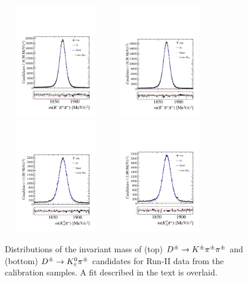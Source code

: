 \begin{figure}[hp]
\label{fig:KpiAsymFitsRun1}
\includegraphics[height=5cm,width=0.4\textwidth]{figs/KpiAsym/fit_negative_kpipi_15up.pdf}
\includegraphics[height=5cm,width=0.4\textwidth]{figs/KpiAsym/fit_positive_kpipi_15up.pdf}\\
\includegraphics[height=5cm,width=0.4\textwidth]{figs/KpiAsym/fit_negative_kspi_15up.pdf}
\includegraphics[height=5cm,width=0.4\textwidth]{figs/KpiAsym/fit_positive_kspi_15up.pdf}
\caption{Distributions of the invariant mass of (top) ${{D}^\pm}\rightarrow{\ensuremath{{K}^\pm}}{\ensuremath{{\pi}^\pm}}{\ensuremath{{\pi}^\pm}}$ and (bottom) ${{D}^\pm}\rightarrow{\ensuremath{{K}^0_{\mathrm{ \scriptscriptstyle S}}}}{\ensuremath{{\pi}^\pm}}$ candidates for Run-II data from the calibration samples. A fit described in the text is overlaid.}
\label{fig:KpiAsymFitsRun2}
\end{figure}


